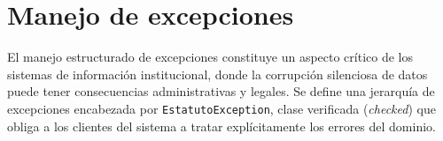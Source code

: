 \section{Manejo de excepciones}
\label{sec:java-excepciones}

\noindent
El manejo estructurado de excepciones constituye un aspecto crítico de los sistemas
de información institucional, donde la corrupción silenciosa de datos puede tener
consecuencias administrativas y legales. Se define una jerarquía de excepciones
encabezada por \texttt{EstatutoException}, clase verificada (\textit{checked}) que
obliga a los clientes del sistema a tratar explícitamente los errores del dominio.

